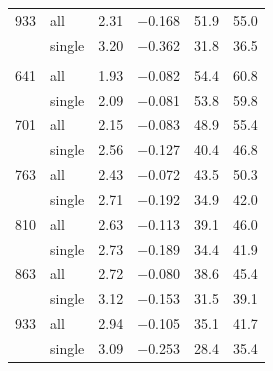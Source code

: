 \begin{table}[H]
\begin{tabular}{r l *{4}{c}}
		933 & all & 2.31 & $-$0.168 & 51.9 & 55.0 \\
		 & single & 3.20 & $-$0.362 & 31.8 & 36.5 \\
		\addlinespace
		\multicolumn{6}{l}{\textit{Small Egg Box}} \\
		641 & all & 1.93 & $-$0.082 & 54.4 & 60.8 \\
		 & single & 2.09 & $-$0.081 & 53.8 & 59.8 \\
		701 & all & 2.15 & $-$0.083 & 48.9 & 55.4 \\
		 & single & 2.56 & $-$0.127 & 40.4 & 46.8 \\
		763 & all & 2.43 & $-$0.072 & 43.5 & 50.3 \\
		 & single & 2.71 & $-$0.192 & 34.9 & 42.0 \\
		810 & all & 2.63 & $-$0.113 & 39.1 & 46.0 \\
		 & single & 2.73 & $-$0.189 & 34.4 & 41.9 \\
		863 & all & 2.72 & $-$0.080 & 38.6 & 45.4 \\
		 & single & 3.12 & $-$0.153 & 31.5 & 39.1 \\
		933 & all & 2.94 & $-$0.105 & 35.1 & 41.7 \\
		 & single & 3.09 & $-$0.253 & 28.4 & 35.4 \\
		\bottomrule
	\end{tabular}
\end{table}

